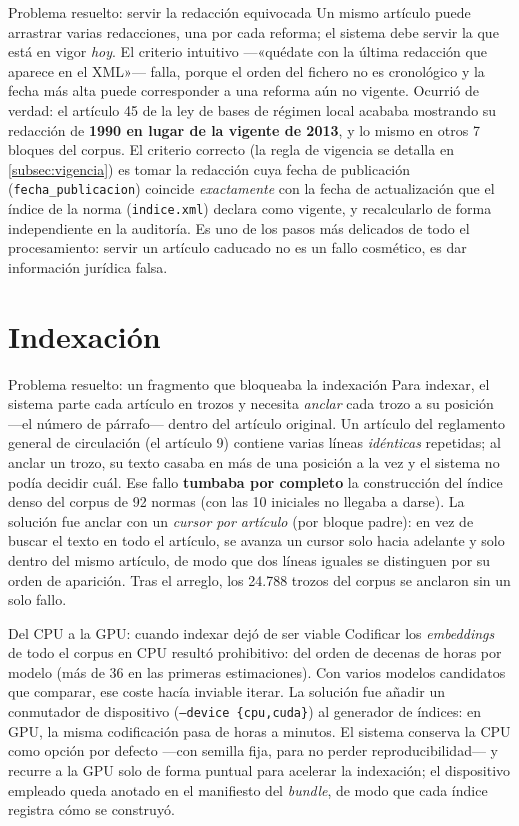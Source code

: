 \begin{myredbox}{Problema resuelto: servir la redacción equivocada}
Un mismo artículo puede arrastrar varias redacciones, una por cada reforma; el sistema debe servir la que está en vigor \emph{hoy}. El criterio intuitivo —«quédate con la última redacción que aparece en el XML»— falla, porque el orden del fichero no es cronológico y la fecha más alta puede corresponder a una reforma aún no vigente. Ocurrió de verdad: el artículo 45 de la ley de bases de régimen local acababa mostrando su redacción de \textbf{1990 en lugar de la vigente de 2013}, y lo mismo en otros 7 bloques del corpus. El criterio correcto (la regla de vigencia se detalla en \ref{subsec:vigencia}) es tomar la redacción cuya fecha de publicación (\texttt{fecha\_publicacion}) coincide \emph{exactamente} con la fecha de actualización que el índice de la norma (\texttt{indice.xml}) declara como vigente, y recalcularlo de forma independiente en la auditoría. Es uno de los pasos más delicados de todo el procesamiento: servir un artículo caducado no es un fallo cosmético, es dar información jurídica falsa.
\end{myredbox}

\section{Indexación}

\begin{myredbox}{Problema resuelto: un fragmento que bloqueaba la indexación}
Para indexar, el sistema parte cada artículo en trozos y necesita \emph{anclar} cada trozo a su posición —el número de párrafo— dentro del artículo original. Un artículo del reglamento general de circulación (el artículo 9) contiene varias líneas \emph{idénticas} repetidas; al anclar un trozo, su texto casaba en más de una posición a la vez y el sistema no podía decidir cuál. Ese fallo \textbf{tumbaba por completo} la construcción del índice denso del corpus de 92 normas (con las 10 iniciales no llegaba a darse). La solución fue anclar con un \emph{cursor por artículo} (por bloque padre): en vez de buscar el texto en todo el artículo, se avanza un cursor solo hacia adelante y solo dentro del mismo artículo, de modo que dos líneas iguales se distinguen por su orden de aparición. Tras el arreglo, los 24.788 trozos del corpus se anclaron sin un solo fallo.
\end{myredbox}

\begin{mybluebox}{Del CPU a la GPU: cuando indexar dejó de ser viable}
Codificar los \emph{embeddings} de todo el corpus en CPU resultó prohibitivo: del orden de decenas de horas por modelo (más de 36 en las primeras estimaciones). Con varios modelos candidatos que comparar, ese coste hacía inviable iterar. La solución fue añadir un conmutador de dispositivo (\texttt{--device \{cpu,cuda\}}) al generador de índices: en GPU, la misma codificación pasa de horas a minutos. El sistema conserva la CPU como opción por defecto —con semilla fija, para no perder reproducibilidad— y recurre a la GPU solo de forma puntual para acelerar la indexación; el dispositivo empleado queda anotado en el manifiesto del \emph{bundle}, de modo que cada índice registra cómo se construyó.
\end{mybluebox}
